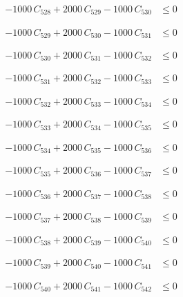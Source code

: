 \documentclass[a4paper,11pt]{article}
\begin{document}
\begin{align}
-1000\,C_{528} + 2000\,C_{529} - 1000\,C_{530} &\leq 0 \nonumber
\end{align}

\begin{align}
-1000\,C_{529} + 2000\,C_{530} - 1000\,C_{531} &\leq 0 \nonumber
\end{align}

\begin{align}
-1000\,C_{530} + 2000\,C_{531} - 1000\,C_{532} &\leq 0 \nonumber
\end{align}

\begin{align}
-1000\,C_{531} + 2000\,C_{532} - 1000\,C_{533} &\leq 0 \nonumber
\end{align}

\begin{align}
-1000\,C_{532} + 2000\,C_{533} - 1000\,C_{534} &\leq 0 \nonumber
\end{align}

\begin{align}
-1000\,C_{533} + 2000\,C_{534} - 1000\,C_{535} &\leq 0 \nonumber
\end{align}

\begin{align}
-1000\,C_{534} + 2000\,C_{535} - 1000\,C_{536} &\leq 0 \nonumber
\end{align}

\begin{align}
-1000\,C_{535} + 2000\,C_{536} - 1000\,C_{537} &\leq 0 \nonumber
\end{align}

\begin{align}
-1000\,C_{536} + 2000\,C_{537} - 1000\,C_{538} &\leq 0 \nonumber
\end{align}

\begin{align}
-1000\,C_{537} + 2000\,C_{538} - 1000\,C_{539} &\leq 0 \nonumber
\end{align}

\begin{align}
-1000\,C_{538} + 2000\,C_{539} - 1000\,C_{540} &\leq 0 \nonumber
\end{align}

\begin{align}
-1000\,C_{539} + 2000\,C_{540} - 1000\,C_{541} &\leq 0 \nonumber
\end{align}

\begin{align}
-1000\,C_{540} + 2000\,C_{541} - 1000\,C_{542} &\leq 0 \nonumber
\end{align}
\end{document}
